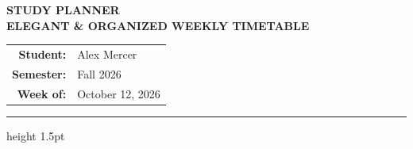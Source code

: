 \documentclass[10pt,a4paper]{article}
\begin{document}
\begin{minipage}[b]{0.55\linewidth}
    {\Huge\bfseries\color{accent} STUDY PLANNER} \\
    \vspace{1mm}
    {\color{neutraldark!70}\bfseries\small ELEGANT \& ORGANIZED WEEKLY TIMETABLE}
\end{minipage}%
\begin{minipage}[b]{0.45\linewidth}
    \raggedleft
    \renewcommand{\arraystretch}{1.2}
    \small
    \begin{tabular}{r l}
      \color{neutraldark!70}\textbf{Student:} & Alex Mercer \\
      \color{neutraldark!70}\textbf{Semester:} & Fall 2026 \\
      \color{neutraldark!70}\textbf{Week of:} & October 12, 2026
    \end{tabular}
\end{minipage}

\vspace{3mm}
{\color{accent}\hrule height 1.5pt}
\vspace{4mm}
\end{document}
